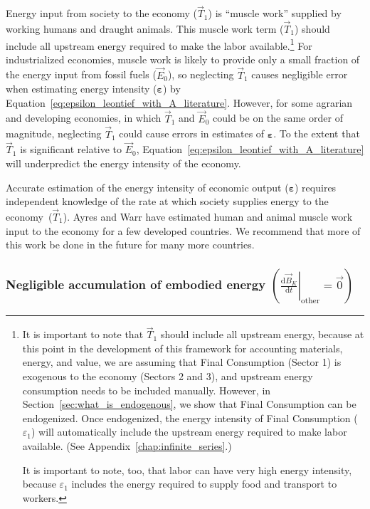 Energy input from society to the economy ($\vec{T}_{1}$)
is ``muscle work'' supplied by working humans 
and draught animals.\cite{Ayres:2003ec,Ayres:2010ug,Warr:2012cg} 
This muscle work term ($\vec{T}_{1}$) should include
all upstream energy required to make the labor available.\footnote{It is important
to note that $\vec{T}_{1}$ should include all upstream energy,
because at this point in the development of this framework 
for accounting materials, energy, and value,
we are assuming that Final Consumption (Sector 1) is exogenous to the economy 
(Sectors 2 and 3), 
and upstream energy consumption needs to be included manually.
However, in Section~\ref{sec:what_is_endogenous}, we show that Final Consumption
can be endogenized.
Once endogenized, the energy intensity of Final Consumption ($\varepsilon_{1}$) 
will automatically include the upstream energy required to make labor available.
(See Appendix~\ref{chap:infinite_series}.)

It is important to note, too, that labor can have very high energy intensity, 
because $\varepsilon_{1}$ includes the energy required to supply food and transport
to workers.} 
For industrialized economies, muscle work 
is likely to provide only a small fraction
of the energy input from fossil fuels ($\vec{E}_{0}$),
so neglecting $\vec{T}_{1}$ causes negligible error when
estimating energy intensity ($\boldsymbol{\varepsilon}$) by
Equation~\ref{eq:epsilon_leontief_with_A_literature}.
However, for some agrarian 
and developing economies, 
in which $\vec{T}_{1}$ and $\vec{E}_{0}$ 
could be on the same order of magnitude,
neglecting $\vec{T}_{1}$ could cause errors
in estimates of $\boldsymbol{\varepsilon}$.
To the extent that $\vec{T}_{1}$ 
is significant relative to $\vec{E}_{0}$,
Equation~\ref{eq:epsilon_leontief_with_A_literature}
will underpredict the energy intensity of the economy.

Accurate estimation of the energy intensity of economic output ($\boldsymbol{\varepsilon}$)
requires independent knowledge of the rate at which society supplies
energy to the economy~($\vec{T}_{1}$). 
Ayres and Warr have estimated human and animal muscle work
input to the economy for a few developed countries.\cite{Ayres:2010ug}
We recommend that more of this work be done 
in the future for many more countries.


\subsubsection{Negligible accumulation of embodied energy
$\left( \left. \frac{\mathrm{d}\vec{B}_{K}}{\mathrm{d}t} \right|_{\mathrm{other}} = \vec{0} \right)$}

